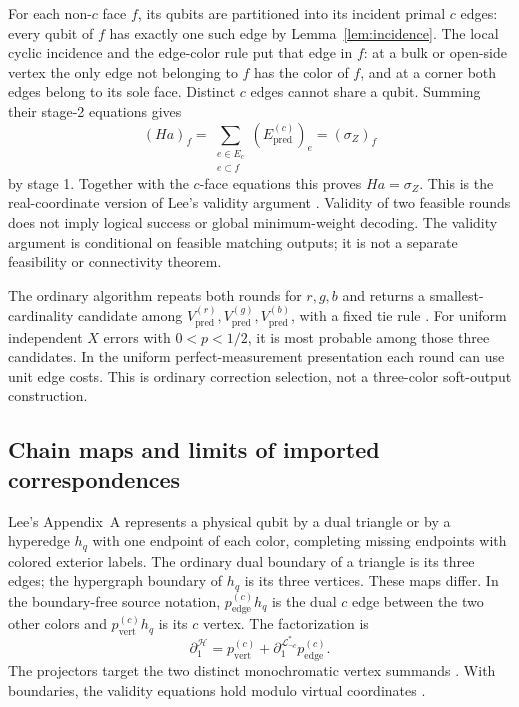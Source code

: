 \documentclass[11pt]{article}
\theoremstyle{definition}
\theoremstyle{plain}
\theoremstyle{remark}
\newcommand{\LL}{\mathcal L}
\newcommand{\pred}{\mathrm{pred}}
\begin{document}
For each non-$c$ face $f$, its qubits are partitioned into its incident
primal $c$ edges: every qubit of $f$ has exactly one such edge by
Lemma~\ref{lem:incidence}. The local cyclic incidence and the edge-color
rule put that edge in $f$: at a bulk or open-side vertex the only edge
not belonging to $f$ has the color of $f$, and at a corner both edges
belong to its sole face. Distinct $c$ edges cannot share a qubit. Summing their stage-2 equations gives
\[
 (Ha)_f=\sum_{\substack{e\in E_c\\e\subset f}}
                 (E_{\pred}^{(c)})_e=(\sigma_Z)_f
\]
by stage 1. Together with the $c$-face equations this proves
$Ha=\sigma_Z$. This is the real-coordinate version of Lee's
validity argument \cite[Appendix~A.2, Claim~1; A.3, Claim~2]{Lee}.
Validity of two feasible rounds does not imply logical success or
global minimum-weight decoding. The validity argument is conditional on feasible matching outputs; it
is not a separate feasibility or connectivity theorem.

The ordinary algorithm repeats both rounds for $r,g,b$ and returns a
smallest-cardinality candidate among
$V_{\pred}^{(r)},V_{\pred}^{(g)},V_{\pred}^{(b)}$, with a fixed tie rule
\cite[Sec.~3, p.~7]{Lee}. For uniform independent $X$ errors with
$0<p<1/2$, it is most probable among those three candidates.
In the uniform perfect-measurement presentation each round can use
unit edge costs. This is ordinary correction selection, not a
three-color soft-output construction.

\subsection{Chain maps and limits of imported correspondences}
Lee's Appendix~A represents a physical qubit by a dual triangle or
by a hyperedge $h_q$ with one endpoint of each color, completing missing
endpoints with colored exterior labels.
The ordinary dual boundary of a triangle is its three edges; the
hypergraph boundary of $h_q$ is its three vertices. These maps differ.
In the boundary-free source notation, $p_{\mathrm{edge}}^{(c)}h_q$
is the dual $c$ edge between the two other colors and
$p_{\mathrm{vert}}^{(c)}h_q$ is its $c$ vertex. The factorization is
\[
 \partial_1^{\mathcal H}
 =p_{\mathrm{vert}}^{(c)}
  +\partial_1^{\LL_{\neg c}^*}p_{\mathrm{edge}}^{(c)} .
\]
The projectors target the two distinct monochromatic vertex summands
\cite[Appendix~A.1, Eq.~(10)]{Lee}.
With boundaries, the validity equations hold modulo virtual coordinates
\cite[Appendix~A.3, Eq.~(13)]{Lee}.
\end{document}
